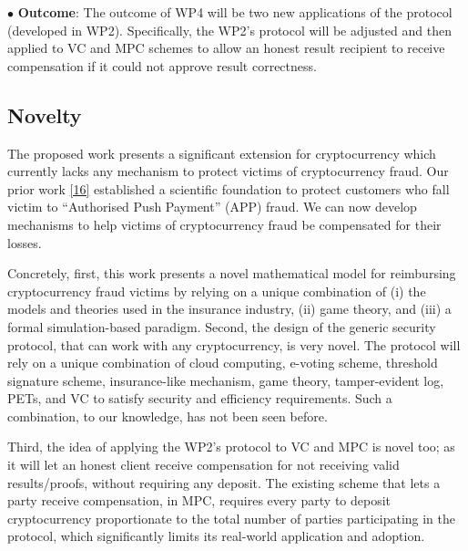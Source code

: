  
 
 
  \noindent$\bullet$\textbf{ Outcome}: The outcome of WP4 will be two new applications of the protocol (developed in WP2). Specifically, the WP2's protocol will be adjusted and then applied to VC and MPC schemes to allow an honest result recipient to receive compensation if it could not approve result correctness. 
 
 \vspace{-5mm}
 \subsection{Novelty}
  \vspace{-1mm}
 
 The proposed work presents a significant extension for cryptocurrency which currently lacks any mechanism to protect victims of cryptocurrency fraud.  Our prior work \href{https://eprint.iacr.org/2022/107.pdf}{[16]} established a scientific foundation to protect customers who fall victim to “Authorised Push Payment” (APP) fraud. We can now develop mechanisms to help victims of cryptocurrency fraud be compensated for their losses.
 
 
 
 

 Concretely, first, this work presents a novel mathematical model for reimbursing cryptocurrency fraud victims by relying on a unique combination of (i) the models and theories used in the insurance industry, (ii) game theory, and (iii) a formal simulation-based paradigm. Second, the design of the generic security protocol, that can work with any cryptocurrency, is very novel. The protocol will rely on a unique combination of cloud computing, e-voting scheme, threshold signature scheme, insurance-like mechanism, game theory, tamper-evident log, PETs, and VC to satisfy security and efficiency requirements. Such a combination, to our knowledge, has not been seen before. 
 


 Third, the idea of applying the WP2's protocol to VC and MPC is novel too; as it will let an honest client receive compensation for not receiving valid results/proofs, without requiring any deposit. The existing scheme that lets a party receive compensation,  in MPC, requires every party to deposit cryptocurrency proportionate to the total number of parties participating in the protocol, which significantly limits its real-world application and adoption.
 
